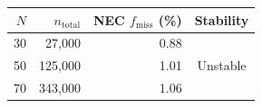 \begin{tabular}{@{}rrrc@{}}
    \toprule
    $N$ & $n_{\text{total}}$ & NEC $f_{\text{miss}}$ (\%) & Stability \\
    \midrule
    30 & 27{,}000 & 0.88 & \multirow{3}{*}{Unstable} \\
    50 & 125{,}000 & 1.01 &  \\
    70 & 343{,}000 & 1.06 &  \\
    \bottomrule
\end{tabular}
